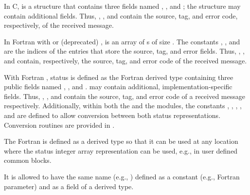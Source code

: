 In C,  is a structure that contains three fields named
, , and ; the
structure may contain additional fields.  Thus, ,
, and  contain the
source, tag, and error code, respectively, of
the received message.

In Fortran with  or (deprecated) ,
 is an array of s of size
.
The constants ,
, and
are the indices of the entries that store the
source, tag, and error fields.  Thus, ,
, and 
contain, respectively, the source,
tag, and error code of the received message.

With Fortran  , status is defined as the
Fortran  derived type 
containing three public  fields named ,
, and .
 may contain additional, implementation-specific fields.
Thus, , ,
and  contain the source,
tag, and error code of a received message respectively.
Additionally, within both the  and the  modules,
the constants ,
, , ,
and 
are defined to allow conversion between both status representations.
Conversion routines are provided in
.

\begin{rationale}
The Fortran 
is defined as a  derived type
so that it can be used at any location where
the status integer array representation can be used,
e.g., in user defined common blocks.
\end{rationale}

\begin{rationale}
It is allowed to have the same name (e.g., )
defined as a constant (e.g., Fortran parameter) and as a field
of a derived type.
\end{rationale}


